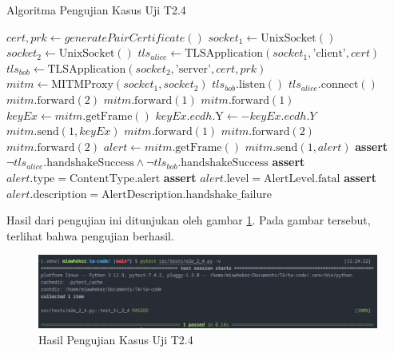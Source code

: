 \begin{algorithm}
  \caption{Algoritma Pengujian Kasus Uji T2.4}
  \label{alg:unit.test.t2.4}
  \begin{algorithmic}
    \State $cert, prk \gets generatePairCertificate()$
    \State $socket_1 \gets \text{UnixSocket}()$
    \State $socket_2 \gets \text{UnixSocket}()$
    \State $tls_{alice} \gets \text{TLSApplication}(socket_1, \text{'client'}, cert)$ 
    \State $tls_{bob} \gets \text{TLSApplication}(socket_2, \text{'server'}, cert, prk)$
    \State $mitm \gets \text{MITMProxy}(socket_1, socket_2)$
    \State
    \State $tls_{bob}.\text{listen}()$  
    \State $tls_{alice}.\text{connect}()$  
    \State
    \State $mitm.\text{forward}(2)$ 
    \State $mitm.\text{forward}(1)$ 
    \State $mitm.\text{forward}(1)$ 
    \State
    \State $keyEx \gets mitm.\text{getFrame}()$ 
    \State $keyEx.ecdh.\text{Y} \gets -keyEx.ecdh.Y$ 
    \State $mitm.\text{send}(1, keyEx)$
    \State
    \State $mitm.\text{forward}(1)$ 
    \State $mitm.\text{forward}(2)$ 
    \State $mitm.\text{forward}(2)$ 
    \State
    \State $alert \gets mitm.\text{getFrame}()$
    \State $mitm.\text{send}(1, alert)$
    \State
    \State \textbf{assert} $\lnot tls_{alice}.\text{handshakeSuccess} \land \lnot tls_{bob}.\text{handshakeSuccess}$
    \State \textbf{assert} $alert.\text{type} = \text{ContentType.alert}$
    \State \textbf{assert} $alert.\text{level} = \text{AlertLevel.fatal}$
    \State \textbf{assert} $alert.\text{description} = \text{AlertDescription.handshake\_failure}$
  \end{algorithmic}
\end{algorithm}

Hasil dari pengujian ini ditunjukan oleh gambar \ref{fig:unit.test.t2.4}. Pada gambar tersebut, terlihat bahwa pengujian berhasil.

\begin{figure}[ht]
  \centering
  \includegraphics[width=\textwidth]{chapters/res/appendix-4/2.4.png}
  \caption{Hasil Pengujian Kasus Uji T2.4}
  \label{fig:unit.test.t2.4}
\end{figure}

